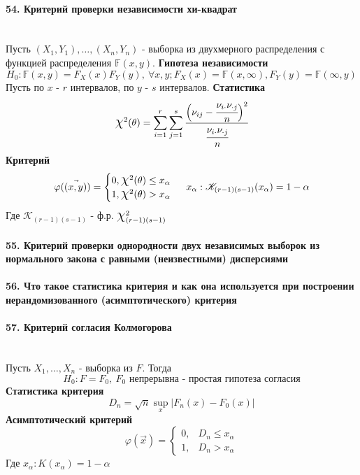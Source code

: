 \documentclass[titlepage]{article}
\newcommand*{\bigchi}{\mbox{\Large$\chi$}} %
\begin{document}
\paragraph{54. Критерий проверки независимости хи-квадрат} ~\\
Пусть $(X_1,Y_1),\dots,(X_n,Y_n)$ - выборка из двухмерного распределения с функцией распределения $\mathbb{F}(x,y)$.
\textbf{Гипотеза независимости}
\[H_0: \mathbb{F}(x,y)=F_X(x)F_Y(y),\ \forall x,y; F_X(x) = \mathbb{F}(x,\infty), F_Y(y) = \mathbb{F}(\infty,y)\]
Пусть по $x$ - $r$ интервалов, по $y$ - $s$ интервалов.
\textbf{Статистика}
\[\bigchi^2(\theta)=\sum_{i=1}^r\sum_{j=1}^s\cfrac{\Big(\nu_{ij}-\cfrac{\nu_{i\cdot}\nu_{\cdot j}}{n}\Big)^2}{\cfrac{\nu_{i\cdot}\nu_{\cdot j}}{n}}\]
\textbf{Критерий}
\[\varphi(\vec {(x,y)}) = \begin{cases}
	0, \bigchi^2(\theta) \leq x_\alpha\\
	1, \bigchi^2(\theta) > x_\alpha
\end{cases}\ x_\alpha: \mathscr{K}_{(r-1)(s-1)}(x_\alpha) = 1 - \alpha\]
Где $\mathscr{K}_{(r-1)(s-1)}$ - ф.р. $\bigchi_{(r-1)(s-1)}^2$

\paragraph{55. Критерий проверки однородности двух независимых выборок из нормального закона с равными (неизвестными) дисперсиями}

\paragraph{56. Что такое статистика критерия и как она используется при построении нерандомизованного (асимптотического) критерия}

\paragraph{57. Критерий согласия Колмогорова} ~\\
Пусть $X_1,\dots,X_n$ - выборка из $F$. Тогда
\[H_0:F=F_0,\ F_0\text{ непрерывна - простая гипотеза согласия}\]
\textbf{Статистика критерия}
\[D_n = \sqrt{n}\sup_x|F_n(x)-F_0(x)|\]
\textbf{Асимптотический критерий}
\[\varphi(\vec x) = \begin{cases}
	0, &D_n \leq x_\alpha\\
	1, &D_n > x_\alpha
\end{cases}\]
Где $x_\alpha: K(x_\alpha) = 1 - \alpha$
\end{document}
